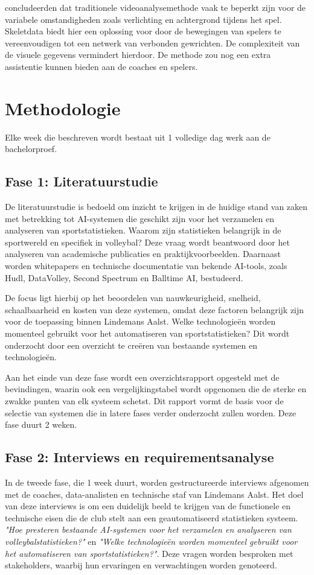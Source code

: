 \textcite{Liang2023} concludeerden dat traditionele videoanalysemethode vaak te beperkt zijn voor de variabele omstandigheden zoals verlichting en achtergrond tijdens het spel. Skeletdata biedt hier een oplossing voor door de bewegingen van spelers te vereenvoudigen tot een netwerk van verbonden gewrichten. De complexiteit van de visuele gegevens vermindert hierdoor. De methode zou nog een extra assistentie kunnen bieden aan de coaches en spelers.
\section{Methodologie}%
\label{sec:methodologie}

Elke week die beschreven wordt bestaat uit 1 volledige dag werk aan de bachelorproef.
\subsection{Fase 1: Literatuurstudie}
De literatuurstudie is bedoeld om inzicht te krijgen in de huidige stand van zaken met betrekking tot AI-systemen die geschikt zijn voor het verzamelen en analyseren van sportstatistieken. Waarom zijn statistieken belangrijk in de sportwereld en specifiek in volleybal? Deze vraag wordt beantwoord door het analyseren van academische publicaties en praktijkvoorbeelden. Daarnaast worden whitepapers en technische documentatie van bekende AI-tools, zoals Hudl, DataVolley, Second Spectrum en Balltime AI, bestudeerd.

De focus ligt hierbij op het beoordelen van nauwkeurigheid, snelheid, schaalbaarheid en kosten van deze systemen, omdat deze factoren belangrijk zijn voor de toepassing binnen Lindemans Aalst. Welke technologieën worden momenteel gebruikt voor het automatiseren van sportstatistieken? Dit wordt onderzocht door een overzicht te creëren van bestaande systemen en technologieën.

Aan het einde van deze fase wordt een overzichtsrapport opgesteld met de bevindingen, waarin ook een vergelijkingstabel wordt opgenomen die de sterke en zwakke punten van elk systeem schetst. Dit rapport vormt de basis voor de selectie van systemen die in latere fases verder onderzocht zullen worden. Deze fase duurt 2 weken.
\subsection{Fase 2: Interviews en requirementsanalyse}
In de tweede fase, die 1 week duurt, worden gestructureerde interviews afgenomen met de coaches, data-analisten en technische staf van Lindemans Aalst. Het doel van deze interviews is om een duidelijk beeld te krijgen van de functionele en technische eisen die de club stelt aan een geautomatiseerd statistieken systeem. \textit{"Hoe presteren bestaande AI-systemen voor het verzamelen en analyseren van volleybalstatistieken?"} en \textit{"Welke technologieën worden momenteel gebruikt voor het automatiseren van sportstatistieken?"}. Deze vragen worden besproken met stakeholders, waarbij hun ervaringen en verwachtingen worden genoteerd.

